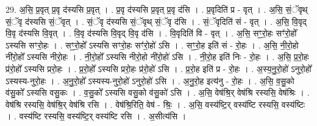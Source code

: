 \documentclass[17pt]{extarticle}
\begin{document}
29. अ॒सि॒ प्र॒वृत् प्र॒वृ द॑स्यसि प्र॒वृत् । . प्र॒वृ द॑स्यसि प्र॒वृत् प्र॒वृ द॑सि । . प्र॒वृदिति॑ प्र - वृत् । . अ॒सि॒ सं॒ॅवृथ् सं॒ॅवृ द॑स्यसि सं॒ॅवृत् । . सं॒ॅवृ द॑स्यसि सं॒ॅवृथ् सं॒ॅवृ द॑सि । . सं॒ॅवृदिति॑ सं - वृत् । . अ॒सि॒ वि॒वृद् वि॒वृ द॑स्यसि वि॒वृत् । . वि॒वृ द॑स्यसि वि॒वृद् वि॒वृ द॑सि । . वि॒वृदिति॑ वि - वृत् । . अ॒सि॒ सꣳ॒॒रो॒हः सꣳ॑रो॒हो᳚ ऽस्यसि सꣳरो॒हः । . सꣳ॒॒रो॒हो᳚ ऽस्यसि सꣳरो॒हः सꣳ॑रो॒हो॑ ऽसि । . सꣳ॒॒रो॒ह इति॑ सं - रो॒हः । . अ॒सि॒ नी॒रो॒हो नी॑रो॒हो᳚ ऽस्यसि नीरो॒हः । . नी॒रो॒हो᳚ ऽस्यसि नीरो॒हो नी॑रो॒हो॑ ऽसि । . नी॒रो॒ह इति॑ निः - रो॒हः । . अ॒सि॒ प्र॒रो॒हः प्र॑रो॒हो᳚ ऽस्यसि प्ररो॒हः । . प्र॒रो॒हो᳚ ऽस्यसि प्ररो॒हः प्र॑रो॒हो॑ ऽसि । . प्र॒रो॒ह इति॑ प्र - रो॒हः । . अ॒स्य॒नु॒रो॒हो॑ ऽनुरो॒हो᳚ ऽस्यस्य-नुरो॒हः । . अ॒नु॒रो॒हो᳚ ऽस्यस्य-नुरो॒हो॑ ऽनुरो॒हो॑ ऽसि । . अ॒नु॒रो॒ह इत्य॑नु - रो॒हः । . अ॒सि॒ व॒सु॒को व॑सु॒को᳚ ऽस्यसि वसु॒कः । . व॒सु॒को᳚ ऽस्यसि वसु॒को व॑सु॒को॑ ऽसि । . अ॒सि॒ वेष॑श्रि॒र् वेष॑श्रि रस्यसि॒ वेष॑श्रिः । . वेष॑श्रि रस्यसि॒ वेष॑श्रि॒र् वेष॑श्रि रसि । . वेष॑श्रि॒रिति॒ वेष॑ - श्रिः॒ । . अ॒सि॒ वस्य॑ष्टि॒र् वस्य॑ष्टि रस्यसि॒ वस्य॑ष्टिः । . वस्य॑ष्टि रस्यसि॒ वस्य॑ष्टि॒र् वस्य॑ष्टि रसि । . अ॒सीत्य॑सि । \newline
\end{document}
